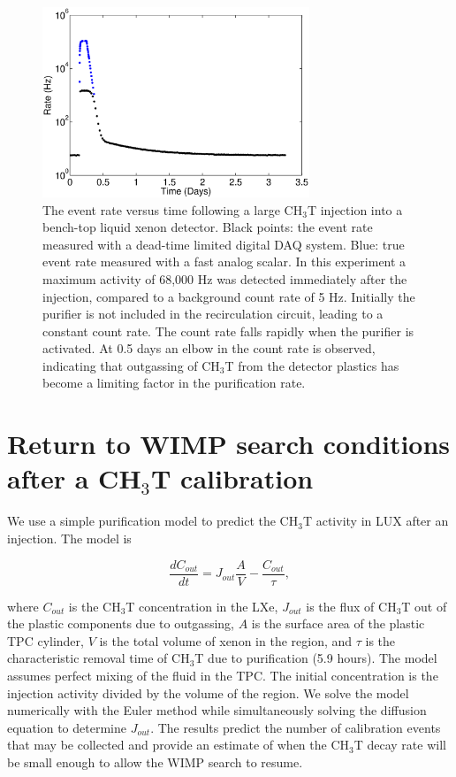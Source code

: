 \begin{figure}[h!]\centering
\includegraphics[width=80mm]{fig/TimeHisto_Analog2.eps}
\caption{The event rate versus time following a large CH$_3$T injection into a bench-top liquid xenon detector. Black points: the event rate measured with a dead-time limited digital DAQ system. Blue: true event rate measured with a fast analog scalar. In this experiment a maximum activity of 68,000 Hz was detected immediately after the injection, compared to a background count rate of 5 Hz. Initially the purifier is not included in the recirculation circuit, leading to a constant count rate. The count rate falls rapidly when the purifier is activated. At 0.5 days an elbow in the count rate is observed, indicating that outgassing of CH$_3$T from the detector plastics has become a limiting factor in the purification rate. }
\label{fig:Density}
\end{figure}


\section{Return to WIMP search conditions after a CH$_3$T calibration }
\label{sec:appendix2}

We use a simple purification model to predict the CH$_3$T activity in LUX after an injection. The model is 

\begin{equation}
\frac{d C_{out}}{dt} = J_{out} \frac{A}{V}-\frac{C_{out}}{\tau},
\end{equation}

\noindent where  $C_{out}$ is the CH$_3$T concentration in the LXe,  $J_{out}$ is the flux of CH$_3$T out of the plastic components due to outgassing,  $A$ is the surface area of the plastic TPC cylinder, $V$ is the total volume of xenon in the  region, and $\tau$ is the characteristic removal time of CH$_3$T due to purification (5.9 hours). The model assumes perfect mixing of the fluid in the TPC. The initial concentration is the injection activity divided by the volume of the  region. We solve the model numerically with the Euler method while simultaneously solving the diffusion equation to determine $J_{out}$. The results predict the number of calibration events that may be collected and provide an estimate of when the CH$_3$T  decay rate will be small enough to allow the WIMP search to resume.

